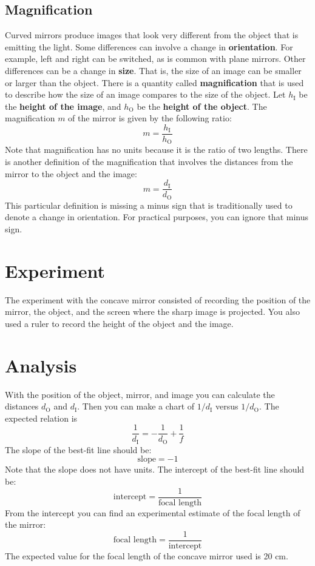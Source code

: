\subsection{Magnification}
%
Curved mirrors produce images that look very different from the object that is emitting the light. Some differences can involve a change in \textbf{orientation}. For example, left and right can be switched, as is common with plane mirrors. Other differences can be a change in \textbf{size}. That is, the size of an image can be smaller or larger than the object. There is a quantity called \textbf{magnification} that is used to describe how the size of an image compares to the size of the object. Let $h_{\text{I}}$ be the \textbf{height of the image}, and $h_{\text{O}}$ be the \textbf{height of the object}. The magnification $m$ of the mirror is given by the following ratio:
\begin{equation}
    m = \frac{h_{\text{I}}}{h_{\text{O}}}
\end{equation}
Note that magnification has no units because it is the ratio of two lengths. There is another definition of the magnification that involves the distances from the mirror to the object and the image:
\begin{equation}
    m = \frac{d_{\text{I}}}{d_{\text{O}}}
\end{equation}
This particular definition is missing a minus sign that is traditionally used to denote a change in orientation. For practical purposes, you can ignore that minus sign.
%
\section{Experiment}
%
The experiment with the concave mirror consisted of recording the position of the mirror, the object, and the screen where the sharp image is projected. You also used a ruler to record the height of the object and the image.
%
\section{Analysis}
%
With the position of the object, mirror, and image you can calculate the distances $d_{\text{O}}$ and $d_{\text{I}}$. Then you can make a chart of $1 / d_{\text{I}}$ versus $1 / d_{\text{O}}$. The expected relation is
\begin{equation}
    \frac{1}{d_{\text{I}}} = -\frac{1}{d_{\text{O}}} + \frac{1}{f}
\end{equation}
The slope of the best-fit line should be:
\begin{equation}
    \text{slope} = -1
\end{equation}
Note that the slope does not have units. The intercept of the best-fit line should be:
\begin{equation}
    \text{intercept} = \frac{1}{\text{focal length}}
\end{equation}
From the intercept you can find an experimental estimate of the focal length of the mirror:
\begin{equation}
    \text{focal length} = \frac{1}{\text{intercept}}
\end{equation}
The expected value for the focal length of the concave mirror used is 20 cm.

